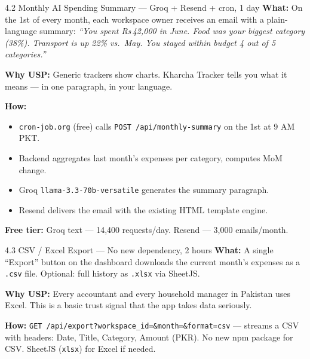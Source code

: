 \documentclass[11pt,a4paper]{article}
\begin{document}
\begin{featurebox}{4.2 \quad Monthly AI Spending Summary \textnormal{\small — Groq + Resend + cron, 1 day}}
\textbf{What:} On the 1st of every month, each workspace owner receives an
email with a plain-language summary:
\emph{``You spent Rs\,42,000 in June. Food was your biggest category (38\%).
Transport is up 22\% vs.\ May. You stayed within budget 4 out of 5 categories.''}

\textbf{Why USP:} Generic trackers show charts. Kharcha Tracker tells you
what it means — in one paragraph, in your language.

\textbf{How:}
\begin{itemize}[leftmargin=1cm, topsep=2pt]
  \item \texttt{cron-job.org} (free) calls \texttt{POST /api/monthly-summary} on the 1st at 9 AM PKT.
  \item Backend aggregates last month's expenses per category, computes MoM change.
  \item Groq \texttt{llama-3.3-70b-versatile} generates the summary paragraph.
  \item Resend delivers the email with the existing HTML template engine.
\end{itemize}

\textbf{Free tier:} Groq text — 14,400 requests/day. Resend — 3,000 emails/month.
\end{featurebox}

\vspace{6pt}

\begin{featurebox}{4.3 \quad CSV / Excel Export \textnormal{\small — No new dependency, 2 hours}}
\textbf{What:} A single ``Export'' button on the dashboard downloads the
current month's expenses as a \texttt{.csv} file.
Optional: full history as \texttt{.xlsx} via SheetJS.

\textbf{Why USP:} Every accountant and every household manager in Pakistan
uses Excel. This is a basic trust signal that the app takes data seriously.

\textbf{How:} \texttt{GET /api/export?workspace\_id=\&month=\&format=csv}
— streams a CSV with headers: Date, Title, Category, Amount (PKR).
No new npm package for CSV. SheetJS (\texttt{xlsx}) for Excel if needed.
\end{featurebox}

\vspace{6pt}
\end{document}
